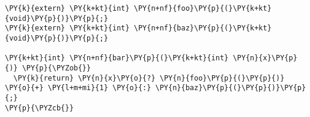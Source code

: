 \begin{Verbatim}[commandchars=\\\{\}]
\PY{k}{extern} \PY{k+kt}{int} \PY{n+nf}{foo}\PY{p}{(}\PY{k+kt}{void}\PY{p}{)}\PY{p}{;}
\PY{k}{extern} \PY{k+kt}{int} \PY{n+nf}{baz}\PY{p}{(}\PY{k+kt}{void}\PY{p}{)}\PY{p}{;}

\PY{k+kt}{int} \PY{n+nf}{bar}\PY{p}{(}\PY{k+kt}{int} \PY{n}{x}\PY{p}{)} \PY{p}{\PYZob{}}
  \PY{k}{return} \PY{n}{x}\PY{o}{?} \PY{n}{foo}\PY{p}{(}\PY{p}{)} \PY{o}{+} \PY{l+m+mi}{1} \PY{o}{:} \PY{n}{baz}\PY{p}{(}\PY{p}{)}\PY{p}{;}
\PY{p}{\PYZcb{}}
\end{Verbatim}
